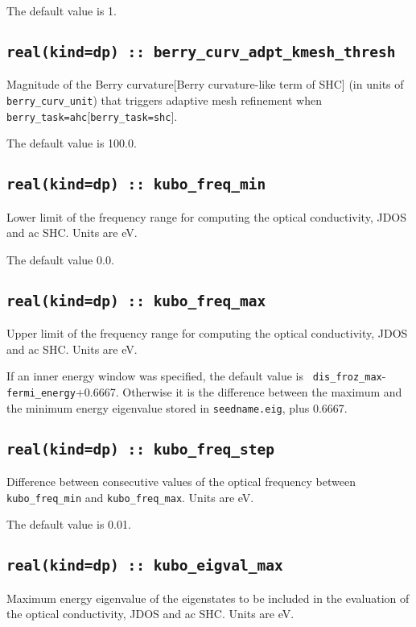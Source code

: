 The default value is 1.


\subsection[berry\_adpt\_kmesh\_thresh]{\tt real(kind=dp) ::
  berry\_curv\_adpt\_kmesh\_thresh}

Magnitude of the Berry curvature[Berry curvature-like term of SHC] (in units of {\tt berry\_curv\_unit})
that triggers adaptive mesh refinement when {\tt berry\_task=ahc}[{\tt berry\_task=shc}].

The default value is 100.0.


\subsection[optics\_energy\_min]{\tt real(kind=dp) :: kubo\_freq\_min}
Lower limit of the frequency range for computing the optical conductivity, JDOS and ac SHC. Units are eV.

The default value 0.0.

\subsection[optics\_energy\_max]{\tt real(kind=dp) :: kubo\_freq\_max}
Upper limit of the frequency range for computing the optical conductivity, JDOS and ac SHC. Units are eV.

If an inner energy window was specified, the default value is {\tt
  dis\_froz\_max}-{\tt fermi\_energy}+0.6667.  Otherwise it is the
difference between the maximum and the minimum energy eigenvalue
stored in {\tt seedname.eig}, plus 0.6667.


\subsection[optics\_energy\_step]{\tt real(kind=dp) :: kubo\_freq\_step}
Difference between consecutive values of the optical frequency
between {\tt kubo\_freq\_min} and {\tt kubo\_freq\_max}. Units are eV.

The default value is 0.01.


\subsection[optics\_energy\_max]{\tt real(kind=dp) ::
  kubo\_eigval\_max}
Maximum energy eigenvalue of the eigenstates to be included in the
evaluation of the optical conductivity, JDOS and ac SHC.  Units are eV.

